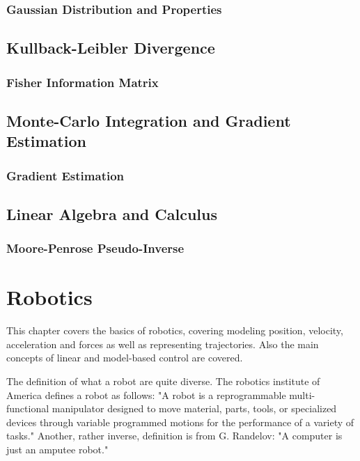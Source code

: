 		\subsection{Gaussian Distribution and Properties} %

	\section{Kullback-Leibler Divergence} %
		\label{sec:klDivergence}


		\subsection{Fisher Information Matrix} %
			\label{subsec:fisherInformationMatrix}


	\section{Monte-Carlo Integration and Gradient Estimation} %

		\subsection{Gradient Estimation} %

	\section{Linear Algebra and Calculus} %

		\subsection{Moore-Penrose Pseudo-Inverse} %

\chapter{Robotics}
	This chapter covers the basics of robotics, covering modeling position, velocity, acceleration and forces as well as representing trajectories. Also the main concepts of linear and model-based control are covered.

	The definition of what a robot are quite diverse. The robotics institute of America defines a robot as follows: "A robot is a reprogrammable multi-functional manipulator designed to move material, parts, tools, or specialized devices through variable programmed motions for the performance of a variety of tasks." Another, rather inverse, definition is from G. Randelov: "A computer is just an amputee robot."

